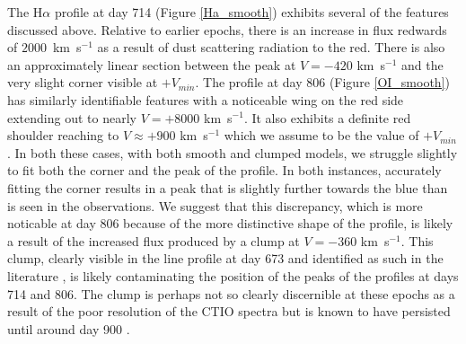 \documentclass[useAMS,usenatbib,usegraphicx]{mnras}
\begin{document}
The H$\alpha$ profile at day 714 (Figure \ref{Ha_smooth}) exhibits several of the features discussed above.  
Relative to earlier epochs, there is an increase in flux redwards of $2000$~km~s$^{-1}$ 
as a result of dust scattering  radiation to the red.  
There is also an approximately linear section between the peak at $V=-420$ 
km~s$^{-1}$ and the very slight corner visible at $+V_{min}$.  The profile 
at day 806 (Figure \ref{OI_smooth}) has similarly identifiable features with a noticeable wing on 
the red side extending out to nearly $V=+8000$ km~s$^{-1}$.  It also exhibits a 
definite red shoulder reaching to $V \approx +900$ km~s$^{-1}$ which we assume 
to be the value of $+V_{min}$.  In both these cases, with both smooth and 
clumped models, we struggle slightly to fit both the corner and the peak 
of the profile.  In both instances, accurately fitting the corner results 
in a peak that is slightly further towards the blue than is seen in the 
observations.  We suggest that this discrepancy, which is more noticable 
at day 806 because of the more distinctive shape of the profile, is likely 
a result of the increased flux produced by a clump at $V=-360$ 
km~s$^{-1}$.  This clump, clearly visible in the line profile at day 673 
and identified as such in the literature 
\citep{Spyromilio1993,Hanuschik1993}, is likely contaminating the 
position of the peaks of the profiles at days 714 and 806.  The clump is 
perhaps not so clearly discernible at these epochs as a result of the poor 
resolution of the CTIO spectra but is known to have persisted until around day 
900 \citep{Hanuschik1993}.
\end{document}
